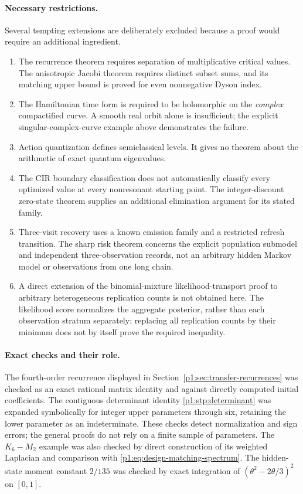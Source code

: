 \documentclass[11pt,a4paper]{article}
\theoremstyle{definition}
\theoremstyle{remark}
\numberwithin{equation}{section}
\begin{document}
\paragraph{Necessary restrictions.}
Several tempting extensions are deliberately excluded because a proof
would require an additional ingredient.
\begin{enumerate}[leftmargin=*,itemsep=4pt]
\item The recurrence theorem requires separation of multiplicative critical
values. The anisotropic Jacobi theorem requires distinct subset sums, and
its matching upper bound is proved for even nonnegative Dyson index.
\item The Hamiltonian time form is required to be holomorphic on the
\emph{complex} compactified curve. A smooth real orbit alone is insufficient;
the explicit singular-complex-curve example above demonstrates the failure.
\item Action quantization defines semiclassical levels. It gives no theorem
about the arithmetic of exact quantum eigenvalues.
\item The CIR boundary classification does not automatically classify every
optimized value at every nonresonant starting point. The integer-discount
zero-state theorem supplies an additional elimination argument for its
stated family.
\item Three-visit recovery uses a known emission family and a restricted
refresh transition. The sharp risk theorem concerns the explicit population
submodel and independent three-observation records, not an arbitrary hidden
Markov model or observations from one long chain.
\item A direct extension of the binomial-mixture likelihood-transport proof
to arbitrary heterogeneous replication counts is not obtained here. The
likelihood score normalizes the aggregate posterior, rather than each
observation stratum separately; replacing all replication counts by their
minimum does not by itself prove the required inequality.
\end{enumerate}

\paragraph{Exact checks and their role.}
The fourth-order recurrence displayed in
Section~\ref{p1:sec:transfer-recurrences} was checked as an exact rational
matrix identity and against directly computed initial coefficients.
The contiguous determinant identity \eqref{p1:stp:determinant} was expanded
symbolically for integer upper parameters through six, retaining the lower
parameter as an indeterminate. These checks detect normalization and sign
errors; the general proofs do not rely on a finite sample of parameters.
The $K_6-M_2$ example was also checked by direct construction of its weighted
Laplacian and comparison with \eqref{p1:eq:design-matching-spectrum}.
The hidden-state moment constant $2/135$ was checked by exact integration
of $(\theta^2-2\theta/3)^2$ on $[0,1]$.
\end{document}
